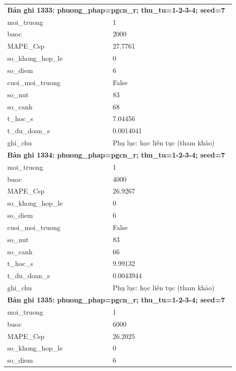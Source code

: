 \begin{longtable}{p{0.43\linewidth}p{0.50\linewidth}}
\midrule
\multicolumn{2}{p{0.95\linewidth}}{\textbf{Bản ghi 1333: phuong\_phap=pgcn\_r; thu\_tu=1-2-3-4; seed=7}} \\
moi\_\allowbreak truong & 1 \\
buoc & 2000 \\
MAPE\_\allowbreak Csp & 27.7761 \\
so\_\allowbreak khong\_\allowbreak hop\_\allowbreak le & 0 \\
so\_\allowbreak diem & 6 \\
cuoi\_\allowbreak moi\_\allowbreak truong & False \\
so\_\allowbreak nut & 83 \\
so\_\allowbreak canh & 68 \\
t\_\allowbreak hoc\_\allowbreak s & 7.04456 \\
t\_\allowbreak du\_\allowbreak doan\_\allowbreak s & 0.0014041 \\
ghi\_\allowbreak chu & Phụ lục: học liên tục (tham khảo) \\
\midrule
\multicolumn{2}{p{0.95\linewidth}}{\textbf{Bản ghi 1334: phuong\_phap=pgcn\_r; thu\_tu=1-2-3-4; seed=7}} \\
moi\_\allowbreak truong & 1 \\
buoc & 4000 \\
MAPE\_\allowbreak Csp & 26.9267 \\
so\_\allowbreak khong\_\allowbreak hop\_\allowbreak le & 0 \\
so\_\allowbreak diem & 6 \\
cuoi\_\allowbreak moi\_\allowbreak truong & False \\
so\_\allowbreak nut & 83 \\
so\_\allowbreak canh & 66 \\
t\_\allowbreak hoc\_\allowbreak s & 9.99132 \\
t\_\allowbreak du\_\allowbreak doan\_\allowbreak s & 0.0043944 \\
ghi\_\allowbreak chu & Phụ lục: học liên tục (tham khảo) \\
\midrule
\multicolumn{2}{p{0.95\linewidth}}{\textbf{Bản ghi 1335: phuong\_phap=pgcn\_r; thu\_tu=1-2-3-4; seed=7}} \\
moi\_\allowbreak truong & 1 \\
buoc & 6000 \\
MAPE\_\allowbreak Csp & 26.2025 \\
so\_\allowbreak khong\_\allowbreak hop\_\allowbreak le & 0 \\
so\_\allowbreak diem & 6 \\

\end{longtable}

